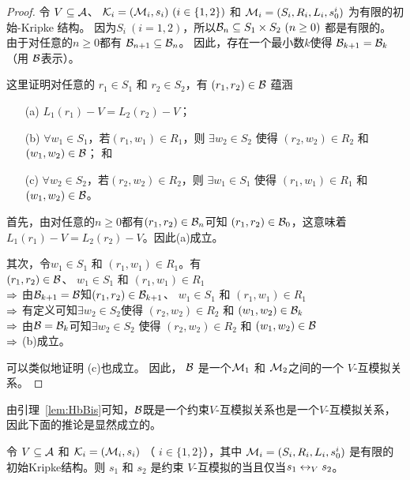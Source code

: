 \begin{proof}
	令 $V \subseteq {\cal A}$、 ${\cal K}_i=({\cal M}_i,s_i)~(i\in\{1,2\})$ 和 ${\cal M}_i=(S_i, R_i,L_i, s_0^i)$ 为有限的初始-Kripke 结构。
	因为$S_i~(i=1,2)$，所以${\cal B}_n\subseteq S_1\times S_2~(n\ge 0)$ 都是有限的。
	由于对任意的$n\geq 0$都有 ${\cal B}_{n+1} \subseteq {\cal B}_n$。
	因此，存在一个最小数$k$使得
	${\cal B}_{k+1} ={\cal B}_k$ （用 ${\cal B}$表示）。

	
	这里证明对任意的 $r_1\in S_1$ 和 $r_2 \in S_2$，有 $(r_1, r_2)\in {\cal B}$ 蕴涵 %
	\begin{itemize}
		\item[(a)] $L_1(r_1)-V = L_2(r_2)-V$；
		\item[(b)] $\forall w_1\in S_1$，若$(r_1, w_1)\in R_1$，则 $\exists w_2 \in S_2$ 使得 $(r_2,w_2) \in R_2$ 和 $(w_1, w_2) \in {\cal B}$； 和
		\item[(c)] $\forall w_2\in S_2$，若$(r_2, w_2)\in R_2$，则 $\exists w_1 \in S_1$ 使得 $(r_1,w_1) \in R_1$ 和 $(w_1, w_2)\in {\cal B} $。
	\end{itemize}
	
	首先，由对任意的$n\ge 0$都有$(r_1, r_2)\in {\cal B}_n$可知 $(r_1, r_2) \in {\cal B}_0$，这意味着
	$L_1(r_1)-V = L_2(r_2)-V$。因此(a)成立。
	
	其次，令$w_1 \in S_1$ 和 $(r_1, w_1)\in R_1$。有 \\
	$(r_1,r_2)\in {\cal B}$、 $w_1 \in S_1$ 和 $(r_1, w_1)\in R_1$\\
	$\Rightarrow$ 由${\cal B}_{k+1}={\cal B}$知$(r_1,r_2)\in {\cal B}_{k+1}$、 $w_1 \in S_1$ 和 $(r_1, w_1)\in R_1$\\
	$\Rightarrow$ 有定义可知$\exists w_2\in S_2$使得 $(r_2, w_2)\in R_2$ 和 $(w_1,w_2)\in {\cal B}_k$\\
	$\Rightarrow$ 由${\cal B}={\cal B}_k$可知$\exists w_2\in S_2$ 使得 $(r_2, w_2)\in R_2$ 和 $(w_1,w_2)\in {\cal B}$\\
	$\Rightarrow$ (b)成立。
	
	可以类似地证明 (c)也成立。
	因此， ${\cal B}$ 是一个${\cal M}_1$ 和 ${\cal M}_2$之间的一个 $V$-互模拟关系。
\end{proof}

由引理~\ref{lem:HbBis}可知，${\cal B}$既是一个约束$V$-互模拟关系也是一个$V$-互模拟关系，因此下面的推论是显然成立的。
\begin{corollary} \label{lem:bounedToGe}
	令 $V \subseteq {\cal A}$ 和 ${\cal K}_i=({\cal M}_i,s_i)$ （ $i\in\{1,2\}$），其中 ${\cal M}_i=(S_i, R_i,L_i, s_0^i)$ 是有限的初始Kripke结构。则
	$s_1$ 和 $s_2$ 是约束 $V$-互模拟的当且仅当$s_1 \leftrightarrow_V s_2$。
\end{corollary}


